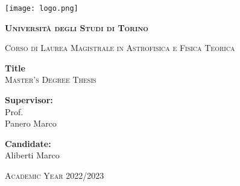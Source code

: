 \thispagestyle{empty}
\begin{center}
    \texttt{[image: logo.png]}
    \vspace{0.5cm}\\
    {\LARGE\bfseries\scshape Università degli Studi di Torino \par}
	\vspace{0,3cm}
	{\large\scshape Corso di Laurea Magistrale in Astrofisica e Fisica Teorica\par}
    \vspace{2cm}
	{\LARGE\bfseries Title}
	\vspace{0.3cm}\\
    {\scshape\Large Master's Degree Thesis}
	\vspace{0,5cm}
\end{center}
\vspace{2cm}
\begin{minipage}[t]{0.4\textwidth} %
    {\large{{\bf Supervisor:}\\
        Prof.\\
        Panero Marco}}
\end{minipage}
\hfill
\begin{minipage}[t]{0.47\textwidth}\raggedleft %
    {\large{{\bf Candidate:}\\
        Aliberti Marco}}
    \vspace{12mm}
\end{minipage}
\hfill
\vspace{18mm}
\begin{center} %
    \large{\scshape Academic Year 2022/2023}
\end{center} 
